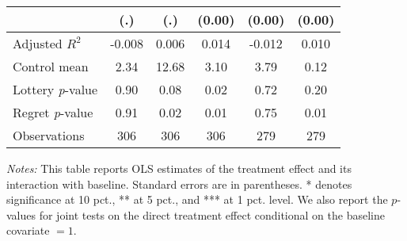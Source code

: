 \begin{table}[htbp]
{\begin{threeparttable}
\begin{tabular}{l*{5}{c}}
                &      (.)         &      (.)         &   (0.00)         &   (0.00)         &   (0.00)         \\
\midrule
Adjusted \(R^{2}\)&   -0.008         &    0.006         &    0.014         &   -0.012         &    0.010         \\
Control mean    &     2.34         &    12.68         &     3.10         &     3.79         &     0.12         \\
Lottery \emph{p}-value&     0.90         &     0.08         &     0.02         &     0.72         &     0.20         \\
Regret \emph{p}-value&     0.91         &     0.02         &     0.01         &     0.75         &     0.01         \\
Observations    &      306         &      306         &      306         &      279         &      279         \\
\bottomrule \end{tabular} \begin{tablenotes}[flushleft] \footnotesize \item \emph{Notes:} This table reports OLS estimates of the treatment effect and its interaction with baseline. Standard errors are in parentheses. * denotes significance at 10 pct., ** at 5 pct., and *** at 1 pct. level. We also report the \(p\)-values for joint tests on the direct treatment effect conditional on the baseline covariate $= 1$. \end{tablenotes} \end{threeparttable} } \end{table}

